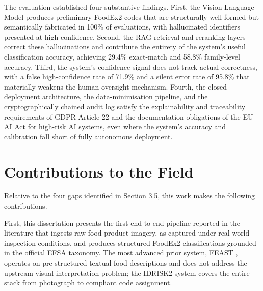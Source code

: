 The evaluation established four substantive findings. First, the Vision-Language Model produces preliminary FoodEx2 codes that are structurally well-formed but semantically fabricated in 100\% of evaluations, with hallucinated identifiers presented at high confidence. Second, the RAG retrieval and reranking layers correct these hallucinations and contribute the entirety of the system's useful classification accuracy, achieving 29.4\% exact-match and 58.8\% family-level accuracy. Third, the system's confidence signal does not track actual correctness, with a false high-confidence rate of 71.9\% and a silent error rate of 95.8\% that materially weakens the human-oversight mechanism. Fourth, the closed deployment architecture, the data-minimisation pipeline, and the cryptographically chained audit log satisfy the explainability and traceability requirements of GDPR Article 22 and the documentation obligations of the EU AI Act for high-risk AI systems, even where the system's accuracy and calibration fall short of fully autonomous deployment.

\hypertarget{contributions-to-the-field}{%
\section{Contributions to the Field}\label{contributions-to-the-field}}

Relative to the four gaps identified in Section 3.5, this work makes the following contributions.

First, this dissertation presents the first end-to-end pipeline reported in the literature that ingests raw food product imagery, as captured under real-world inspection conditions, and produces structured FoodEx2 classifications grounded in the official EFSA taxonomy. The most advanced prior system, FEAST \parencite{lorenzo_molfetta_47d7c4cd}, operates on pre-structured textual food descriptions and does not address the upstream visual-interpretation problem; the IDRISK2 system covers the entire stack from photograph to compliant code assignment.

